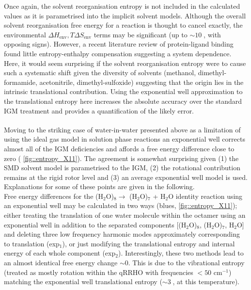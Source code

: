 \documentclass[../main.tex]{subfiles}
\begin{document}
Once again, the solvent reorganisation entropy is not included in the calculated values as it is parametrised into the implicit solvent models. Although the overall solvent reorganisation free energy for a reaction is thought to cancel exactly, the environmental $\Delta H_\text{env}, T\Delta S_\text{env}$ terms may be significant (up to $\sim 10\;$\kcal, with opposing signs).\cite{Grunwald1995}
However, a recent literature review of protein-ligand binding found little entropy-enthalpy compensation suggesting a system dependence.\cite{Chodera2013} Here, it would seem surprising if the solvent reorganisation entropy were to cause such a systematic shift given the diversity of solvents (methanol, dimethyl-formamide, acetonitrile, dimethyl-sulfoxide) suggesting that the origin lies in the intrinsic translational contribution. Using the exponential well approximation to the translational entropy here increases the absolute accuracy over the standard IGM treatment and provides a quantification of the likely error. 
\\\\
Moving to the striking case of water-in-water presented above as a limitation of using the ideal gas model in solution phase reactions an exponential well corrects almost all of the IGM deficiencies and affords a free energy difference close to zero (\figurename{ \ref{fig::entropy_X11}}). The agreement is somewhat surprising given (1) the SMD solvent model is parametrised to the IGM, (2) the rotational contribution remains at the rigid rotor level and (3) an average exponential well model is used. Explanations for some of these points are given in the following.
\\
Free energy differences for the (H$_2$O)$_8 \longrightarrow$ (H$_2$O)$_7$ +  H$_2$O identity reaction using an exponential well may be calculated in two ways (blues, \figurename{ \ref{fig::entropy_X11}}); either treating the translation of one water molecule within the octamer using an exponential well in addition to the separated components [(H$_2$O)$_8$, (H$_2$O)$_7$, H$_2$O] and deleting three low frequency harmonic modes approximately corresponding to translation (exp$_1$), or just modifying the translational entropy and internal energy of each whole component  (exp$_2$). Interestingly, these two methods lead to an almost identical free energy change $\sim 0$. This is due to the vibrational entropy (treated as mostly rotation within the qRRHO with frequencies $< 50$ cm$^{-1}$) matching the exponential well translational entropy ($\sim 3\;$\kcal, at this temperature). 
\end{document}
